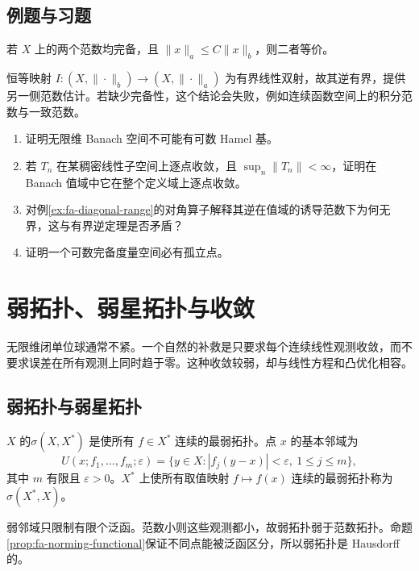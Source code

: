 \documentclass[UTF8,12pt,a4paper,fontset=fandol]{ctexbook}
\begin{document}
\section{例题与习题}
\begin{example}[两个完备范数的等价性]
若 $X$ 上的两个范数均完备，且 $\|x\|_a\leq C\|x\|_b$，则二者等价。
\end{example}
\begin{solve}
恒等映射 $I:(X,\|\cdot\|_b)\to(X,\|\cdot\|_a)$ 为有界线性双射，故其逆有界，提供另一侧范数估计。若缺少完备性，这个结论会失败，例如连续函数空间上的积分范数与一致范数。
\end{solve}
\begin{enumerate}
 \item\label{exer:fa-hamel} 证明无限维 Banach 空间不可能有可数 Hamel 基。
 \item\label{exer:fa-dense-convergence} 若 $T_n$ 在某稠密线性子空间上逐点收敛，且 $\sup_n\|T_n\|<\infty$，证明在 Banach 值域中它在整个定义域上逐点收敛。
 \item 对例\ref{ex:fa-diagonal-range}的对角算子解释其逆在值域的诱导范数下为何无界，这与有界逆定理是否矛盾？
 \item 证明一个可数完备度量空间必有孤立点。
\end{enumerate}

\chapter{弱拓扑、弱星拓扑与收敛}
\label{chap:fa-weak}

无限维闭单位球通常不紧。一个自然的补救是只要求每个连续线性观测收敛，而不要求误差在所有观测上同时趋于零。这种收敛较弱，却与线性方程和凸优化相容。

\section{弱拓扑与弱星拓扑}
\begin{definition}
$X$ 的$\sigma(X,X^*)$ 是使所有 $f\in X^*$ 连续的最弱拓扑。点 $x$ 的基本邻域为
\[
 U(x;f_1,\ldots,f_m;\varepsilon)=
 \{y\in X:|f_j(y-x)|<\varepsilon,\ 1\leq j\leq m\},
\]
其中 $m$ 有限且 $\varepsilon>0$。$X^*$ 上使所有取值映射 $f\mapsto f(x)$ 连续的最弱拓扑称为$\sigma(X^*,X)$。
\end{definition}
弱邻域只限制有限个泛函。范数小则这些观测都小，故弱拓扑弱于范数拓扑。命题\ref{prop:fa-norming-functional}保证不同点能被泛函区分，所以弱拓扑是 Hausdorff 的。
\end{document}

